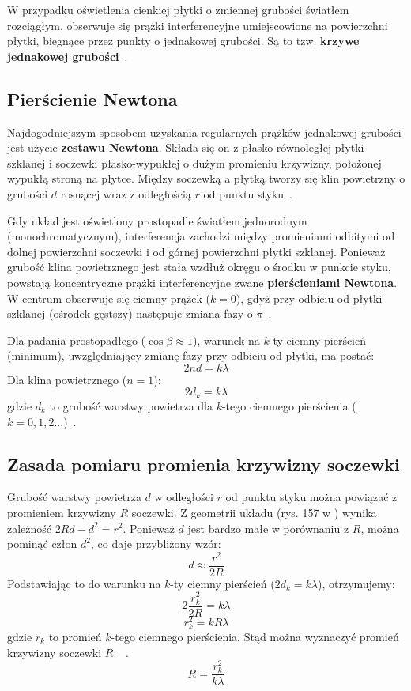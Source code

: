 \documentclass[a4paper,12pt]{article}
\begin{document}
W przypadku oświetlenia cienkiej płytki o zmiennej grubości światłem rozciągłym, obserwuje się prążki interferencyjne umiejscowione na powierzchni płytki, biegnące przez punkty o jednakowej grubości. Są to tzw. \textbf{krzywe jednakowej grubości}~\citep{Drynski1976}.

\subsection*{Pierścienie Newtona}

Najdogodniejszym sposobem uzyskania regularnych prążków jednakowej grubości jest użycie \textbf{zestawu Newtona}. Składa się on z płasko-równoległej płytki szklanej i soczewki płasko-wypukłej o dużym promieniu krzywizny, położonej wypukłą stroną na płytce. Między soczewką a płytką tworzy się klin powietrzny o grubości \(d\) rosnącej wraz z odległością \(r\) od punktu styku~\citep{Drynski1976}.

Gdy układ jest oświetlony prostopadle światłem jednorodnym (monochromatycznym), interferencja zachodzi między promieniami odbitymi od dolnej powierzchni soczewki i od górnej powierzchni płytki szklanej. Ponieważ grubość klina powietrznego jest stała wzdłuż okręgu o środku w punkcie styku, powstają koncentryczne prążki interferencyjne zwane \textbf{pierścieniami Newtona}. W centrum obserwuje się ciemny prążek (\(k=0\)), gdyż przy odbiciu od płytki szklanej (ośrodek gęstszy) następuje zmiana fazy o \(\pi\)~\citep{Drynski1976}.

Dla padania prostopadłego (\(\cos\beta \approx 1\)), warunek na \(k\)-ty ciemny pierścień (minimum), uwzględniający zmianę fazy przy odbiciu od płytki, ma postać:
$$
    2nd = k\lambda
$$
Dla klina powietrznego (\(n=1\)):
$$
    2d_k = k\lambda
$$
gdzie \(d_k\) to grubość warstwy powietrza dla \(k\)-tego ciemnego pierścienia (\(k=0, 1, 2...\))~\citep{Drynski1976}.

\subsection*{Zasada pomiaru promienia krzywizny soczewki}
Grubość warstwy powietrza \(d\) w odległości \(r\) od punktu styku można powiązać z promieniem krzywizny \(R\) soczewki. Z geometrii układu (rys. 157 w \citep{Drynski1976}) wynika zależność \(2Rd - d^2 = r^2\). Ponieważ \(d\) jest bardzo małe w porównaniu z \(R\), można pominąć człon \(d^2\), co daje przybliżony wzór:
$$
    d \approx \frac{r^2}{2R}
$$
Podstawiając to do warunku na \(k\)-ty ciemny pierścień (\(2d_k = k\lambda\)), otrzymujemy:
$$
    2 \frac{r_k^2}{2R} = k\lambda
$$
$$
    r_k^2 = k R \lambda
$$
gdzie \(r_k\) to promień \(k\)-tego ciemnego pierścienia. Stąd można wyznaczyć promień krzywizny soczewki \(R\):
~\citep{Drynski1976}.
$$
    R = \frac{r_k^2}{k\lambda}
$$
\end{document}
